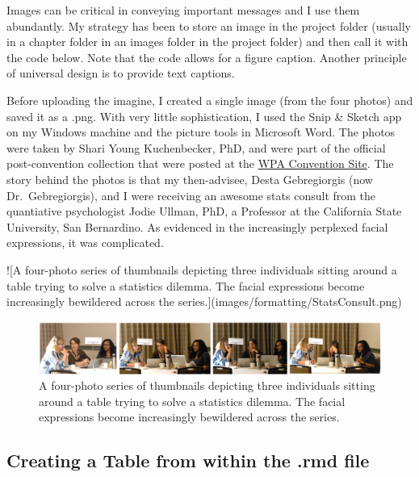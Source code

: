 \documentclass[
]{book}
\newenvironment{Shaded}{\begin{snugshade}}{\end{snugshade}}
\newcommand{\NormalTok}[1]{#1}
\newcommand{\SpecialCharTok}[1]{\textcolor[rgb]{0.00,0.00,0.00}{#1}}
\begin{document}
Images can be critical in conveying important messages and I use them abundantly. My strategy has been to store an image in the project folder (usually in a chapter folder in an images folder in the project folder) and then call it with the code below. Note that the code allows for a figure caption. Another principle of universal design is to provide text captions.

Before uploading the imagine, I created a single image (from the four photos) and saved it as a .png. With very little sophistication, I used the Snip \& Sketch app on my Windows machine and the picture tools in Microsoft Word. The photos were taken by Shari Young Kuchenbecker, PhD, and were part of the official post-convention collection that were posted at the \href{https://westernpsych.org/2018-convention-photos/}{WPA Convention Site}. The story behind the photos is that my then-advisee, Desta Gebregiorgis (now Dr.~Gebregiorgis), and I were receiving an awesome stats consult from the quantiative psychologist Jodie Ullman, PhD, a Professor at the California State University, San Bernardino. As evidenced in the increasingly perplexed facial expressions, it was complicated.

\begin{Shaded}
\begin{Highlighting}[]
\SpecialCharTok{!}\NormalTok{[A four}\SpecialCharTok{{-}}\NormalTok{photo series of thumbnails depicting three individuals sitting around a table trying to solve a statistics dilemma. The facial expressions become increasingly bewildered across the series.](images}\SpecialCharTok{/}\NormalTok{formatting}\SpecialCharTok{/}\NormalTok{StatsConsult.png)}
\end{Highlighting}
\end{Shaded}

\begin{figure}
\centering
\includegraphics{images/formatting/StatsConsult.png}
\caption{A four-photo series of thumbnails depicting three individuals sitting around a table trying to solve a statistics dilemma. The facial expressions become increasingly bewildered across the series.}
\end{figure}

\hypertarget{creating-a-table-from-within-the-.rmd-file}{%
\subsection{Creating a Table from within the .rmd file}\label{creating-a-table-from-within-the-.rmd-file}}
\end{document}
